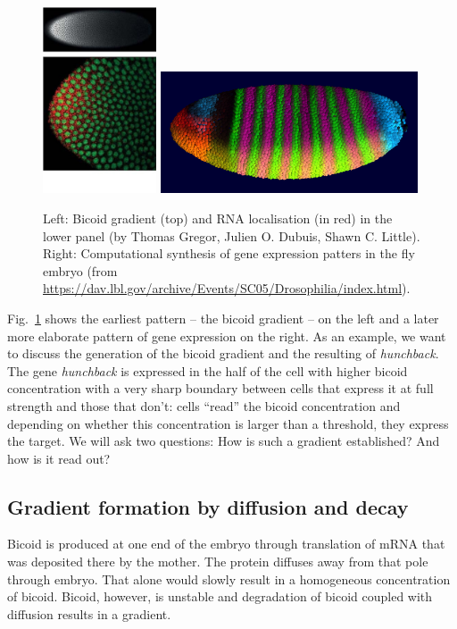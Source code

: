 \begin{figure}[tb]
	\centering
	\includegraphics[width=0.3\textwidth]{figures/Fluorescent_labeling_of_Bicoid_GFP_and_mRNA.jpg}
	\includegraphics[width=0.68\textwidth]{figures/fly_embryo.png}
	\caption{Left: Bicoid gradient (top) and RNA localisation (in red) in the lower panel (by Thomas Gregor, Julien O. Dubuis, Shawn C. Little).
	Right: Computational synthesis of gene expression patters in the fly embryo (from \url{https://dav.lbl.gov/archive/Events/SC05/Drosophilia/index.html}).
	}
	\label{fig:fly_gene_expression}
\end{figure}

Fig.~\ref{fig:fly_gene_expression} shows the earliest pattern -- the bicoid gradient --  on the left and a later more elaborate pattern of gene expression on the right.
As an example, we want to discuss the generation of the bicoid gradient and the resulting of {\it hunchback}.
The gene {\it hunchback} is expressed in the half of the cell with higher bicoid concentration with a very sharp boundary between cells that express it at full strength and those that don't: cells ``read'' the bicoid concentration and depending on whether this concentration is larger than a threshold, they express the target.
We will ask two questions: How is such a gradient established? And how is it read out?


\subsection*{Gradient formation by diffusion and decay}
Bicoid is produced at one end of the embryo through translation of mRNA that was deposited there by the mother.
The protein diffuses away from that pole through embryo.
That alone would slowly result in a homogeneous concentration of bicoid.
Bicoid, however, is unstable and degradation of bicoid coupled with diffusion results in a gradient.

